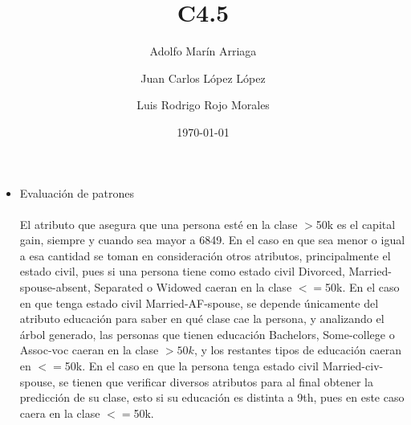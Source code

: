 \documentclass{article}
\title{C4.5}
\author{Adolfo Marín Arriaga \and Juan Carlos López López \and Luis Rodrigo Rojo Morales}
\date{\today\\}
\begin{document}
 \maketitle
 
 \begin{itemize}
 \item Evaluación de patrones\\\\
 El atributo que asegura que una persona esté en la clase $>$50k es el capital gain, siempre y cuando sea mayor a 6849. En el caso en que sea menor o igual a esa cantidad se toman en consideración otros atributos, principalmente el estado civil, pues si una persona tiene como estado civil Divorced, Married-spouse-absent, Separated o Widowed caeran en la clase $<=$50k. En el caso en que tenga estado civil Married-AF-spouse, se depende únicamente del atributo educación para saber en qué clase cae la persona, y analizando el árbol generado, las personas que tienen educación Bachelors, Some-college o Assoc-voc caeran en la clase $>50k$, y los restantes tipos de educación caeran en $<=$50k. En el caso en que la persona tenga estado civil Married-civ-spouse, se tienen que verificar diversos atributos para al final obtener la predicción de su clase, esto si su educación es distinta a 9th, pues en este caso caera en la clase $<=$50k.
 

\end{itemize}
\end{document}
